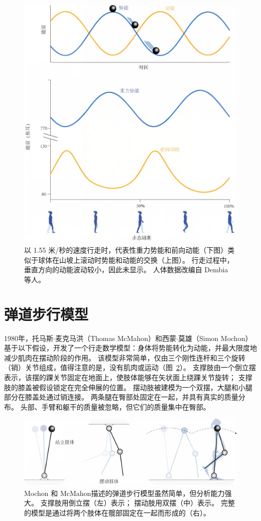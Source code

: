 \begin{figure}[!htb]
	\centering
	\includegraphics[width=0.8\linewidth]{chap2/2_8}
	\caption{以 1.55 米/秒的速度行走时，代表性重力势能和前向动能（下图）类似于球体在山坡上滚动时势能和动能的交换（上图）。
		行走过程中，垂直方向的动能波动较小，因此未显示。
		人体数据改编自 Dembia 等人\cite{dembia2017simulating}。 \label{fig:2_8}}
\end{figure}


\section{弹道步行模型}

1980年，托马斯$\cdot$麦克马洪（Thomas McMahon）和西蒙$\cdot$莫雄（Simon Mochon）基于以下假设，开发了一个行走数学模型：身体将势能转化为动能，并最大限度地减少肌肉在摆动阶段的作用。
该模型非常简单，仅由三个刚性连杆和三个旋转（销）关节组成，值得注意的是，没有肌肉或运动（图~\ref{fig:2_9}）。
支撑肢由一个倒立摆表示，该摆的踝关节固定在地面上，使肢体能够在矢状面上绕踝关节旋转；
支撑肢的膝盖被假设锁定在完全伸展的位置。
摆动肢被建模为一个双摆，大腿和小腿部分在膝盖处通过销连接。
两条腿在臀部处固定在一起，并具有真实的质量分布。
头部、手臂和躯干的质量被忽略，但它们的质量集中在臀部。


\begin{figure}[!htb]
	\centering
	\includegraphics[width=0.8\linewidth]{chap2/2_9}
	\caption{Mochon 和 McMahon\cite{mochon1980ballistic}描述的弹道步行模型虽然简单，但分析能力强大。
		支撑肢用倒立摆（左）表示；
		摆动肢用双摆（中）表示。
		完整的模型是通过将两个肢体在髋部固定在一起而形成的（右）。 \label{fig:2_9}}
\end{figure}


